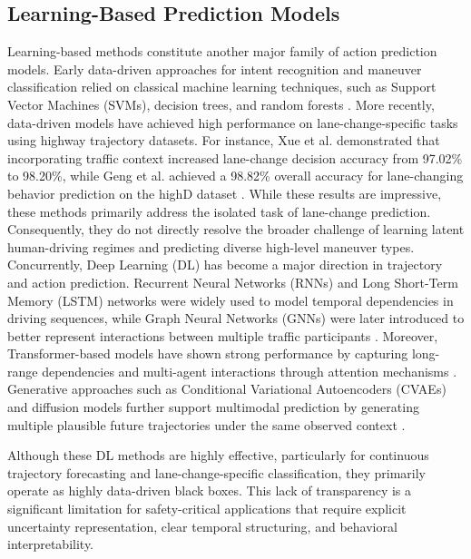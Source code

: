 \documentclass[upint,subscriptcorrection,varvw,hyphenate,balance,greek,russian,vietnamese,german]{asmeconf} %
\begin{document}
\subsection{Learning-Based Prediction Models}
Learning-based methods constitute another major family of action prediction models. 
Early data-driven approaches for intent recognition and maneuver classification relied on classical machine learning techniques, such as Support Vector Machines (SVMs), 
decision trees, and random forests \cite{app112210562}. 
More recently, data-driven models have achieved high performance on lane-change-specific tasks using highway trajectory datasets.
For instance, Xue et al. demonstrated that incorporating traffic context increased lane-change decision accuracy from 97.02\% to 98.20\%, while Geng et al. achieved a 98.82\% 
overall accuracy for lane-changing behavior prediction on the highD dataset \cite{XUE2022103738,geng2023ensemble}. 
While these results are impressive, these methods primarily address the isolated task of lane-change prediction. 
Consequently, they do not directly resolve the broader challenge of learning latent human-driving regimes and predicting diverse high-level maneuver types. 
Concurrently, Deep Learning (DL)  has become a major direction in trajectory and action prediction. Recurrent Neural Networks 
(RNNs) and Long Short-Term Memory (LSTM) networks were widely used to model temporal dependencies in driving sequences, while Graph Neural Networks (GNNs) were later introduced 
to better represent 
interactions between multiple traffic participants \cite{Goodfellow-et-al-2016,salzmann2021trajectrondynamicallyfeasibletrajectoryforecasting}. 
Moreover, Transformer-based models have shown strong performance by capturing long-range dependencies and multi-agent interactions through attention 
mechanisms \cite{vaswaniattention,ngiam2022scenetransformerunifiedarchitecture,shi2023motiontransformerglobalintention,inproceedingshivt}. 
Generative approaches such as Conditional Variational Autoencoders (CVAEs) and diffusion models further support multimodal prediction by generating multiple plausible future trajectories 
under the same observed context 
\cite{NIPS2015_8d55a249,salzmann2021trajectrondynamicallyfeasibletrajectoryforecasting,mangalam2020journeydestinationendpointconditioned,ho2020denoisingdiffusionprobabilisticmodels,jiang2023motiondiffusercontrollablemultiagentmotion}.

Although these DL methods are highly effective, particularly for continuous trajectory forecasting and lane-change-specific classification, they primarily operate as highly data-driven black boxes. 
This lack of transparency is a significant limitation for safety-critical applications that require explicit uncertainty representation, clear temporal structuring, and behavioral interpretability.
\end{document}
